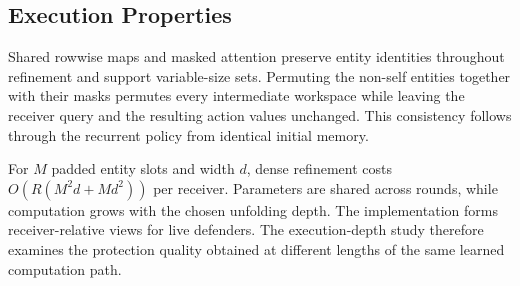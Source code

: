 \subsection{Execution Properties}
Shared rowwise maps and masked attention preserve entity identities throughout refinement and support variable-size sets. Permuting the non-self entities together with their masks permutes every intermediate workspace while leaving the receiver query and the resulting action values unchanged. This consistency follows through the recurrent policy from identical initial memory.

For $M$ padded entity slots and width $d$, dense refinement costs $O(R(M^2d+Md^2))$ per receiver. Parameters are shared across rounds, while computation grows with the chosen unfolding depth. The implementation forms receiver-relative views for live defenders. The execution-depth study therefore examines the protection quality obtained at different lengths of the same learned computation path.
